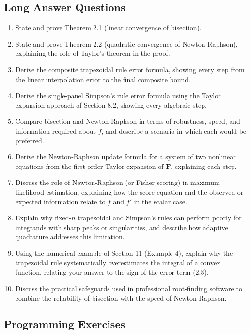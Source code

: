 \documentclass[
]{article}
\providecommand{\tightlist}{%
  \setlength{\itemsep}{0pt}\setlength{\parskip}{0pt}}
\begin{document}
\subsection{Long Answer Questions}\label{long-answer-questions}

\begin{enumerate}
\def\labelenumi{\arabic{enumi}.}
\tightlist
\item
  State and prove Theorem 2.1 (linear convergence of bisection).
\item
  State and prove Theorem 2.2 (quadratic convergence of Newton-Raphson),
  explaining the role of Taylor's theorem in the proof.
\item
  Derive the composite trapezoidal rule error formula, showing every
  step from the linear interpolation error to the final composite bound.
\item
  Derive the single-panel Simpson's rule error formula using the Taylor
  expansion approach of Section 8.2, showing every algebraic step.
\item
  Compare bisection and Newton-Raphson in terms of robustness, speed,
  and information required about \(f\), and describe a scenario in which
  each would be preferred.
\item
  Derive the Newton-Raphson update formula for a system of two nonlinear
  equations from the first-order Taylor expansion of \(\mathbf F\),
  explaining each step.
\item
  Discuss the role of Newton-Raphson (or Fisher scoring) in maximum
  likelihood estimation, explaining how the score equation and the
  observed or expected information relate to \(f\) and \(f'\) in the
  scalar case.
\item
  Explain why fixed-\(n\) trapezoidal and Simpson's rules can perform
  poorly for integrands with sharp peaks or singularities, and describe
  how adaptive quadrature addresses this limitation.
\item
  Using the numerical example of Section 11 (Example 4), explain why the
  trapezoidal rule systematically overestimates the integral of a convex
  function, relating your answer to the sign of the error term (2.8).
\item
  Discuss the practical safeguards used in professional root-finding
  software to combine the reliability of bisection with the speed of
  Newton-Raphson.
\end{enumerate}

\subsection{Programming Exercises}\label{programming-exercises}
\end{document}
